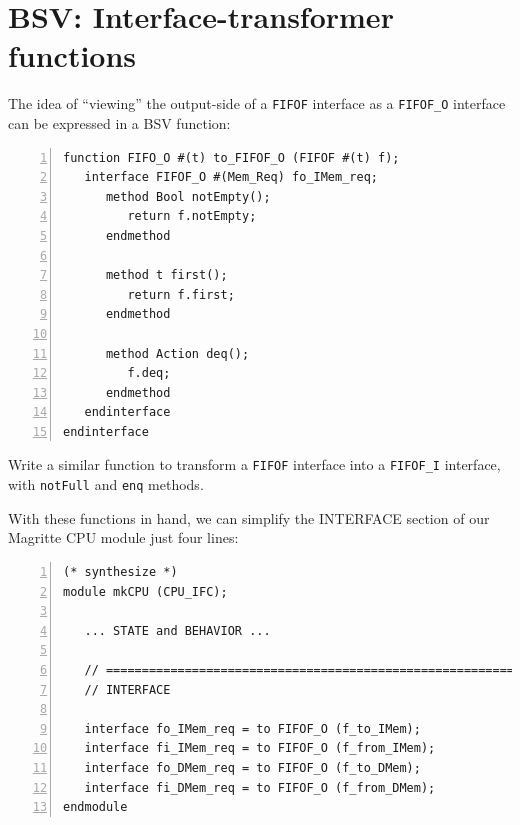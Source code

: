 
\section{BSV: Interface-transformer functions}


The idea of ``viewing'' the output-side of a \verb|FIFOF| interface as
a \verb|FIFOF_O| interface can be expressed in a BSV function:

\begin{Verbatim}[frame=single, numbers=left]
function FIFO_O #(t) to_FIFOF_O (FIFOF #(t) f);
   interface FIFOF_O #(Mem_Req) fo_IMem_req;
      method Bool notEmpty();
         return f.notEmpty;
      endmethod

      method t first();
         return f.first;
      endmethod

      method Action deq();
         f.deq;
      endmethod
   endinterface
endinterface
\end{Verbatim}


\hdivider

\Exercise

Write a similar function to transform a \verb|FIFOF| interface into a
\verb|FIFOF_I| interface, with \verb|notFull| and \verb|enq| methods.

\Endexercise

With these functions in hand, we can simplify the INTERFACE section of
our Magritte CPU module just four lines:


\begin{Verbatim}[frame=single, numbers=left]
(* synthesize *)
module mkCPU (CPU_IFC);

   ... STATE and BEHAVIOR ...

   // ================================================================
   // INTERFACE

   interface fo_IMem_req = to FIFOF_O (f_to_IMem);
   interface fi_IMem_req = to FIFOF_O (f_from_IMem);
   interface fo_DMem_req = to FIFOF_O (f_to_DMem);
   interface fi_DMem_req = to FIFOF_O (f_from_DMem);
endmodule
\end{Verbatim}

